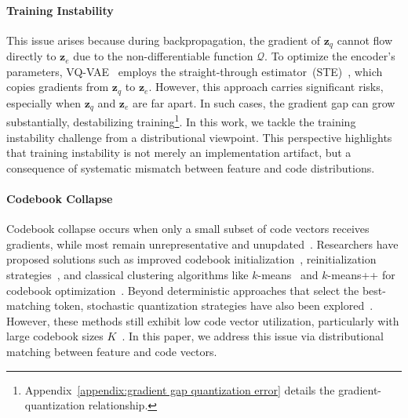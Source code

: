 \paragraph{Training Instability}
This issue arises because during backpropagation, the gradient of $\bm{z}_q$ cannot flow directly to $\bm{z}_e$ due to the non-differentiable function $\mathcal{Q}$. To optimize the encoder's parameters, VQ-VAE~\cite{Oord2017NeuralDR} employs the straight-through estimator~(STE)~\cite{Bengio2013EstimatingOP}, which copies gradients from $\bm{z}_q$ to $\bm{z}_e$. However, this approach carries significant risks, especially when $\bm{z}_q$ and $\bm{z}_e$ are far apart. In such cases, the gradient gap can grow substantially, destabilizing training\footnote{Appendix~\ref{appendix:gradient gap quantization error} details the gradient-quantization relationship.}. In this work, we tackle the training instability challenge from a distributional viewpoint. This perspective highlights that training instability is not merely an implementation artifact, but a consequence of systematic mismatch between feature and code distributions.

\paragraph{Codebook Collapse} 
Codebook collapse occurs when only a small subset of code vectors receives gradients, while most remain unrepresentative and unupdated~\cite{Dhariwal2020JukeboxAG,Yu2021VectorquantizedIM,Lee2022AutoregressiveIG,Zheng2023OnlineCC}. Researchers have proposed solutions such as improved codebook initialization~\cite{Zhu2024ScalingTC}, reinitialization strategies~\cite{Dhariwal2020JukeboxAG,Williams2020HierarchicalQA}, and classical clustering algorithms like $k$-means~\cite{Bradley1998RefiningIP} and $k$-means++\cite{Arthur2007kmeansTA} for codebook optimization~\cite{Razavi2019GeneratingDH,Zheng2023OnlineCC}. Beyond deterministic approaches that select the best-matching token, stochastic quantization strategies have also been explored~\cite{Zhang2023RegularizedVQ,Ramesh2021ZeroShotTG,Takida2022SQVAEVB}. However, these methods still exhibit low code vector utilization, particularly with large codebook sizes $K$~\cite{Zheng2023OnlineCC,Mentzer2023FiniteSQ}. In this paper, we address this issue via distributional matching between feature and code vectors.

